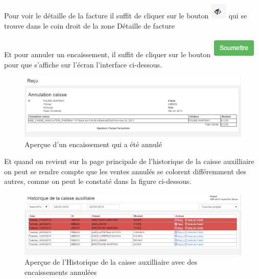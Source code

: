 \documentclass[12pt,a4paper]{report}
\begin{document}
Pour voir le détaille de la facture il suffit de cliquer sur le bouton \includegraphics[scale=0.7]{pic/SeeInvoice.png} qui se trouve dans le coin droit de la zone Détaille de facture   


Et pour annuler un encaissement, il suffit de cliquer sur le bouton \includegraphics[scale=0.7]{pic/soumettreGreen.png}  pour que s'affiche sur l'écran l'interface ci-dessous.

\begin{figure}[h]
\begin{center}
\includegraphics[width=14cm]{pic/InvoAnnCaiAux.png}
\end{center}
\caption{Aperçue d'un encaissement qui a été annulé}
\label{Aperçue d'un encaissement qui a été annulé}
\end{figure}

Et quand on revient sur la page principale de l'historique de la caisse auxilliaire on peut se rendre compte que les ventes annulés se colorent différemment des autres, comme on peut le constaté dans la figure ci-dessous.

\begin{figure}[h]
\begin{center}
\includegraphics[width=14cm]{pic/HisCaissDellOk.png}
\end{center}
\caption{Aperçue de l'Historique de la caisse auxilliaire avec des encaissements annulées}
\label{Aperçue de l'Historique de la caisse auxilliaire avec des encaissements annulées}
\end{figure}
\end{document}
